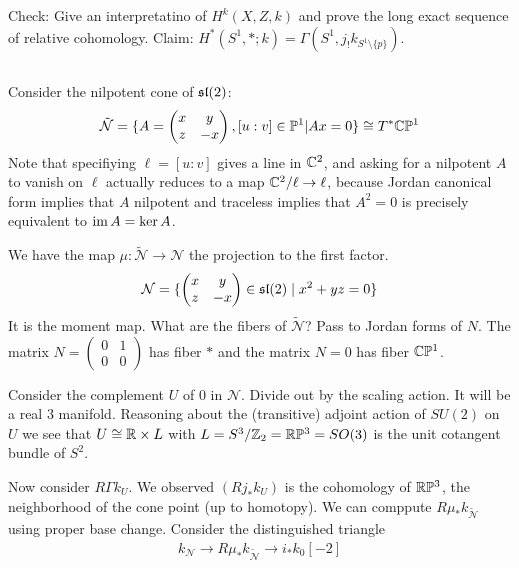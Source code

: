 \documentclass[12pt]{article}
\begin{document}
Check: Give an interpretatino of $H^k(X,Z,k)$ and prove the long exact sequence of relative cohomology.
Claim: $H^*(S^1,*;k) = \Gamma(S^1, j_! k_{S^1\setminus \{p\}})$.

\subsection{}
Consider the nilpotent cone of $\sl(2)$:
\begin{align*}
    \tilde{\mathcal{N}} = \set{ A = \begin{pmatrix}
    x & y\\
    z & -x
\end{pmatrix}, [u:v] \in \mathbb P^1 | Ax = 0} \cong T^*\C\P^1
\end{align*}
Note that specifiying $\ell = [u:v]$ gives a line in $\C^2$, and asking for a nilpotent $A$ to vanish on $\ell$ actually reduces to a map $\C^2/\ell \to \ell$, because Jordan canonical form implies that $A$ nilpotent and traceless implies that $A^2 = 0$ is precisely equivalent to $\im A = \ker A$.

We have the map $\mu: \tilde{\mathcal{N}} \to \mathcal{N}$ the projection to the first factor. \begin{align*}
\mathcal N = \set{ \begin{pmatrix}
    x & y\\
    z & -x
\end{pmatrix} \in \sl(2) \mid x^2 + yz = 0}
\end{align*}
It is the moment map.
What are the fibers of $\tilde{\mathcal{N}}$? Pass to Jordan forms of $N$. The matrix $N = \begin{pmatrix}
    0 & 1\\
    0 & 0
\end{pmatrix}$ has fiber $*$ and the matrix $N = 0$ has fiber $\C\P^1$. 

Consider the complement $U$ of $0$ in $\mathcal N$. Divide out by the scaling action. It will be a real 3 manifold. Reasoning about the (transitive) adjoint action of $SU(2)$ on $U$ we see that $U \cong \R \times L$ with $L = S^3/\Z_2 = \R\P^3 = SO(3)$ is the unit cotangent bundle of $S^2$.

Now consider $R\Gamma k_U$. We observed $(Rj_* k_U)$ is the cohomology of $\R\P^3$, the neighborhood of the cone point (up to homotopy). We can comppute $R\mu_* k_{\tilde{\mathcal{N}}}$ using proper base change. Consider the distinguished triangle
\begin{align*}
    k_{\mathcal N} \to R\mu_* k_{\tilde{\mathcal{N}}} \to i_* k_0[-2]
\end{align*}
\end{document}
